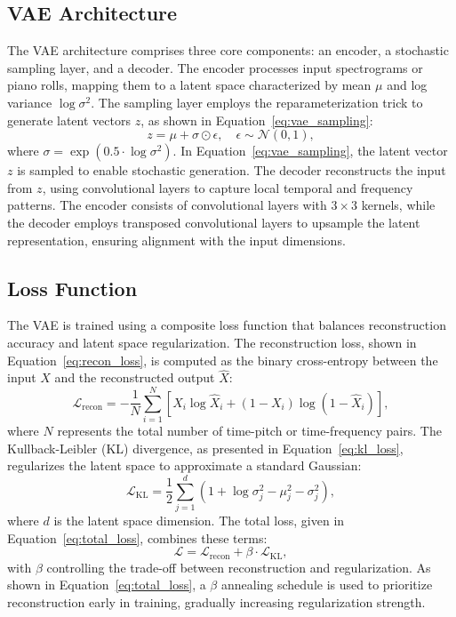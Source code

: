 \documentclass[conference]{IEEEtran}
\begin{document}
\subsection{VAE Architecture}
The VAE architecture comprises three core components: an encoder, a stochastic sampling layer, and a decoder. The encoder processes input spectrograms or piano rolls, mapping them to a latent space characterized by mean $\mu$ and log variance $\log\sigma^2$. The sampling layer employs the reparameterization trick to generate latent vectors $z$, as shown in Equation~\ref{eq:vae_sampling}:
\begin{equation}
\label{eq:vae_sampling}
    z = \mu + \sigma \odot \epsilon, \quad \epsilon \sim \mathcal{N}(0, 1),
\end{equation}
where $\sigma = \exp(0.5 \cdot \log\sigma^2)$. In Equation~\ref{eq:vae_sampling}, the latent vector $z$ is sampled to enable stochastic generation. The decoder reconstructs the input from $z$, using convolutional layers to capture local temporal and frequency patterns. The encoder consists of convolutional layers with $3 \times 3$ kernels, while the decoder employs transposed convolutional layers to upsample the latent representation, ensuring alignment with the input dimensions.


\subsection{Loss Function}
The VAE is trained using a composite loss function that balances reconstruction accuracy and latent space regularization. The reconstruction loss, shown in Equation~\ref{eq:recon_loss}, is computed as the binary cross-entropy between the input $X$ and the reconstructed output $\hat{X}$:
\begin{equation}
\label{eq:recon_loss}
    \mathcal{L}_{\text{recon}} = -\frac{1}{N} \sum_{i=1}^N \left[ X_i \log \hat{X}_i + (1 - X_i) \log (1 - \hat{X}_i) \right],
\end{equation}
where $N$ represents the total number of time-pitch or time-frequency pairs. The Kullback-Leibler (KL) divergence, as presented in Equation~\ref{eq:kl_loss}, regularizes the latent space to approximate a standard Gaussian:
\begin{equation}
\label{eq:kl_loss}
    \mathcal{L}_{\text{KL}} = \frac{1}{2} \sum_{j=1}^d \left( 1 + \log\sigma_j^2 - \mu_j^2 - \sigma_j^2 \right),
\end{equation}
where $d$ is the latent space dimension. The total loss, given in Equation~\ref{eq:total_loss}, combines these terms:
\begin{equation}
\label{eq:total_loss}
    \mathcal{L} = \mathcal{L}_{\text{recon}} + \beta \cdot \mathcal{L}_{\text{KL}},
\end{equation}
with $\beta$ controlling the trade-off between reconstruction and regularization. As shown in Equation~\ref{eq:total_loss}, a $\beta$ annealing schedule is used to prioritize reconstruction early in training, gradually increasing regularization strength.
\end{document}
